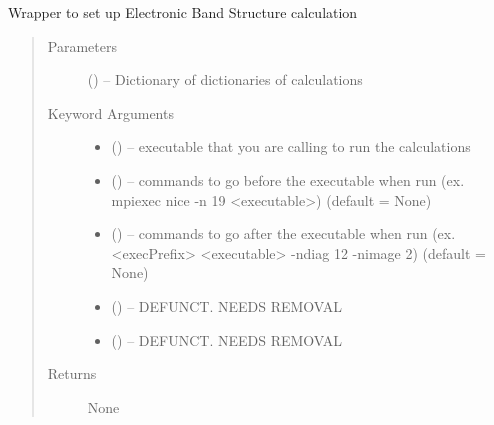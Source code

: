 \documentclass[letterpaper,10pt,english]{sphinxmanual}
\begin{document}
\begin{fulllineitems}
\label{\detokenize{run:run.bands}}
Wrapper to set up Electronic Band Structure calculation
\begin{quote}\begin{description}
\item[{Parameters}] \leavevmode
{} () -- Dictionary of dictionaries of calculations

\item[{Keyword Arguments}] \leavevmode\begin{itemize}
\item {} 
 () -- executable that you are calling to run the calculations

\item {} 
 () -- commands to go before the executable when run
(ex. mpiexec nice -n 19 \textless{}executable\textgreater{}) (default = None)

\item {} 
 () -- commands to go after the executable when run
(ex. \textless{}execPrefix\textgreater{} \textless{}executable\textgreater{} -ndiag 12 -nimage 2) (default = None)

\item {} 
 () -- DEFUNCT. NEEDS REMOVAL

\item {} 
 () -- DEFUNCT. NEEDS REMOVAL

\end{itemize}

\item[{Returns}] \leavevmode
None

\end{description}\end{quote}

\end{fulllineitems}

\end{document}
